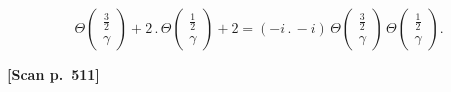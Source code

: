 \documentclass[11pt]{article}
\begin{document}
\[
\Theta\!\begin{pmatrix}\tfrac{3}{2}\\ \gamma\end{pmatrix} + 2\,.\,\Theta\!\begin{pmatrix}\tfrac{1}{2}\\ \gamma\end{pmatrix} + 2 = (-i\,.\,-i)\,\Theta\!\begin{pmatrix}\tfrac{3}{2}\\ \gamma\end{pmatrix}\,\Theta\!\begin{pmatrix}\tfrac{1}{2}\\ \gamma\end{pmatrix}.
\]

\bigskip

\noindent\textbf{[Scan p.~511]}

\medskip
\end{document}
